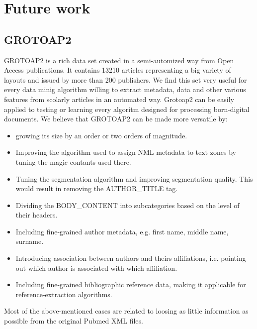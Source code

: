 \section{Future work}
\subsection{GROTOAP2}
GROTOAP2 is a rich data set created in a semi-automized way from Open Access publications. It contains 13210 articles representing a big variety of layouts and issued by more than 200 publishers. We find this set very useful for every data minig algorithm willing to extract metadata, data and other various features from scolarly articles in an automated way. Grotoap2 can be easily applied to testing or learning every algoritm designed for processing born-digital documents.
\quad
We believe that GROTOAP2 can be made more versatile by:
\begin{itemize}
\item growing its size by an order or two orders of magnitude.
\item Improving the algorithm used to assign NML metadata to text zones by tuning the magic contants used there.
\item Tuning the segmentation algorithm and improving segmentation quality. This would result in removing the AUTHOR\_TITLE tag.
\item Dividing the BODY\_CONTENT into subcategories based on the level of their headers.
\item Including fine-grained author metadata, e.g. first name, middle name, surname.
\item Introducing association between authors and theirs affiliations, i.e. pointing out which author is associated with which affiliation.
\item Including fine-grained bibliographic reference data, making it applicable for reference-extraction algorithms.
\end{itemize}
Most of the above-mentioned cases are related to loosing as little information as possible from the original Pubmed XML files.

